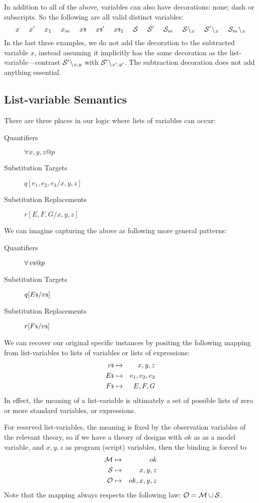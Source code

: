 In addition to all of the above,
variables can also have decorations: none; dash or subscripts.
So the following are all valid distinct variables:
\[
x~~~~x'~~~~x_1~~~~x_m~~~~{x}{\scriptstyle\$}~~~~{x}{\scriptstyle\$}'~~~~{x}{\scriptstyle\$}_1~~~~\mathcal S~~~~\mathcal S'~~~~\mathcal S_m
~~~~\mathcal S{}\!\setminus\!{}_{x}~~~~\mathcal S'{}\!\setminus\!{}_{x}~~~~\mathcal S_m{}\!\setminus\!{}_{x}
\]
In the last three examples, we do not add the decoration to the subtracted
variable $x$, instead assuming it implicitly has the same decoration as the
list-variable---contrast $\mathcal S'{}\!\setminus\!{}_{x,y}$ with $\mathcal S'{}\!\setminus\!{}_{x',y'}$.
The subtraction decoration does not add anything essential.

\subsection{List-variable Semantics}

There are three places in our logic where lists of variables can occur:
\begin{description}
  \item[Quantifiers] $\forall x,y,z @ p$
  \item[Substitution Targets] $q[e_1,e_2,e_3/x,y,z]$
  \item[Substitution Replacements] $r[E,F,G/x,y,z]$
\end{description}
We can imagine capturing the above as following more general patterns:
\begin{description}
  \item[Quantifiers] $\forall \lst v @ p$
  \item[Substitution Targets] $q[{E}{\scriptstyle\$}/{v}{\scriptstyle\$}]$
  \item[Substitution Replacements] $r[{F}{\scriptstyle\$}/{v}{\scriptstyle\$}]$
\end{description}
We can recover our original specific instances by positing the
following mapping from list-variables to lists of variables
or lists of expressions:
\begin{eqnarray*}
   {v}{\scriptstyle\$} &\mapsto& x,y,z
\\ {E}{\scriptstyle\$} &\mapsto& e_1,e_2,e_3
\\ {F}{\scriptstyle\$} &\mapsto& E,F,G
\end{eqnarray*}
In effect, the meaning of a list-variable is ultimately
a set of possible lists of zero or more standard variables, or expressions.

For reserved list-variables, the meaning is fixed by the observation variables
of the relevant theory, so if we have a theory of designs with $ok$ as
as a model variable, and $x,y,z$ as program (script) variables, then
the binding is forced to
\begin{eqnarray*}
   \mathcal M &\mapsto& ok
\\ \mathcal S &\mapsto& x,y,z
\\ \mathcal O &\mapsto& ok,x,y,z
\end{eqnarray*}
Note that the mapping always respects the following law: $\mathcal O=\mathcal M\cup\mathcal S$.

